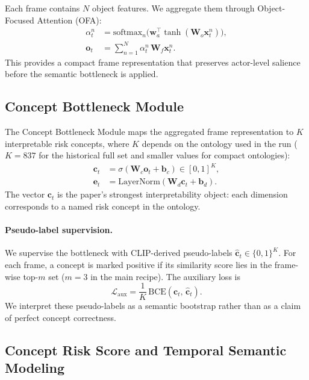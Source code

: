 Each frame contains $N$ object features. We aggregate them through
Object-Focused Attention (OFA):
\begin{align}
  \alpha^n_t &= \mathrm{softmax}_n\bigl(\mathbf{w}_a^\top
    \tanh(\mathbf{W}_o \mathbf{x}^n_t)\bigr), \\
  \mathbf{o}_t &= \sum_{n=1}^N \alpha^n_t\,\mathbf{W}_f \mathbf{x}^n_t.
\end{align}
This provides a compact frame representation that preserves actor-level
salience before the semantic bottleneck is applied.

\subsection{Concept Bottleneck Module}

The Concept Bottleneck Module maps the aggregated frame representation to
$K$ interpretable risk concepts, where $K$ depends on the ontology used in the
run ($K{=}837$ for the historical full set and smaller values for compact
ontologies):
\begin{align}
  \mathbf{c}_t &= \sigma(\mathbf{W}_c \mathbf{o}_t + \mathbf{b}_c)
    \in [0,1]^K, \\
  \mathbf{e}_t &= \mathrm{LayerNorm}(\mathbf{W}_d \mathbf{c}_t + \mathbf{b}_d).
\end{align}
The vector $\mathbf{c}_t$ is the paper's strongest interpretability object:
each dimension corresponds to a named risk concept in the ontology.

\paragraph{Pseudo-label supervision.}
We supervise the bottleneck with CLIP-derived pseudo-labels
$\hat{\mathbf{c}}_t \in \{0,1\}^K$. For each frame, a concept is marked
positive if its similarity score lies in the frame-wise top-$m$ set
($m{=}3$ in the main recipe). The auxiliary loss is
\begin{equation}
  \mathcal{L}_{\text{aux}}
  = \frac{1}{K}\,\mathrm{BCE}(\mathbf{c}_t,\,\hat{\mathbf{c}}_t).
\end{equation}
We interpret these pseudo-labels as a semantic bootstrap rather than as a claim
of perfect concept correctness.

\subsection{Concept Risk Score and Temporal Semantic Modeling}

